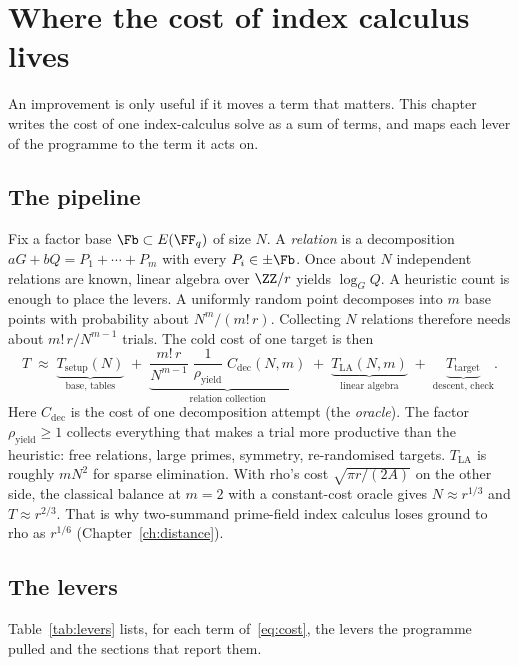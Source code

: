 \chapter{Where the cost of index calculus lives}\label{ch:model}

An improvement is only useful if it moves a term that matters. This chapter
writes the cost of one index-calculus solve as a sum of terms, and maps each
lever of the programme to the term it acts on.

\section{The pipeline}

Fix a factor base $\Fb\subset E(\FF_q)$ of size $N$. A \emph{relation} is a
decomposition $aG+bQ=P_1+\cdots+P_m$ with every $P_i\in\pm\Fb$. Once about
$N$ independent relations are known, linear algebra over $\ZZ/r$ yields
$\log_G Q$. A heuristic count is enough to place the levers. A uniformly
random point decomposes into $m$ base points with probability about
$N^m/(m!\,r)$. Collecting $N$ relations therefore needs about
$m!\,r/N^{m-1}$ trials. The cold cost of one target is then
\begin{equation}\label{eq:cost}
  T \;\approx\;
  \underbrace{T_{\mathrm{setup}}(N)}_{\text{base, tables}}
  \;+\;
  \underbrace{\frac{m!\,r}{N^{m-1}}\;\frac{1}{\rho_{\mathrm{yield}}}\;
  C_{\mathrm{dec}}(N,m)}_{\text{relation collection}}
  \;+\;
  \underbrace{T_{\mathrm{LA}}(N,m)}_{\text{linear algebra}}
  \;+\;
  \underbrace{T_{\mathrm{target}}}_{\text{descent, check}}.
\end{equation}
Here $C_{\mathrm{dec}}$ is the cost of one decomposition attempt (the
\emph{oracle}). The factor $\rho_{\mathrm{yield}}\ge1$ collects everything
that makes a trial more productive than the heuristic: free relations,
large primes, symmetry, re-randomised targets. $T_{\mathrm{LA}}$ is roughly
$mN^2$ for sparse elimination. With rho's cost $\sqrt{\pi r/(2A)}$ on the
other side, the classical balance at $m=2$ with a constant-cost oracle gives
$N\approx r^{1/3}$ and $T\approx r^{2/3}$. That is why two-summand
prime-field index calculus loses ground to rho as $r^{1/6}$
(Chapter~\ref{ch:distance}).

\section{The levers}

Table~\ref{tab:levers} lists, for each term of~\eqref{eq:cost}, the levers
the programme pulled and the sections that report them.

